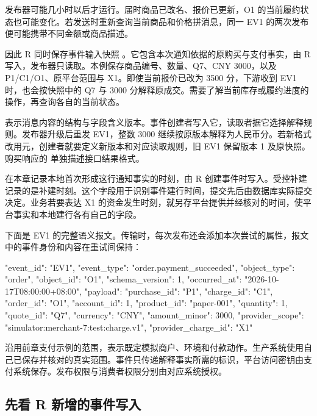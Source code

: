 发布器可能几小时以后才运行。届时商品已改名、报价已更新，O1 的当前履约状态也可能变化。若发送时重新查询当前商品和价格拼消息，同一 EV1 的两次发布便可能携带不同金额或商品描述。

因此 R 同时保存事件输入快照 。它包含本次通知依据的原购买与支付事实，由 R 写入，发布器只读取。本例保存商品编号、数量、Q7、CNY 3000，以及 P1/C1/O1、原平台范围与 X1。即使当前报价已改为 3500 分，下游收到 EV1 时，也会按快照中的 Q7 与 3000 分解释原成交。需要了解当前库存或履约进度的操作，再查询各自的当前状态。


 表示消息内容的结构与字段含义版本。事件创建者写入它，读取者据它选择解释规则。发布器升级后重发 EV1，整数 3000 继续按原版本解释为人民币分。若新格式改用元，创建者就要定义新版本和对应读取规则，旧 EV1 保留版本 1 及原快照。购买响应的  单独描述接口结果格式。

 在本章记录本地首次形成这行通知事实的时刻，由 R 创建事件时写入。受控补建记录的是补建时刻。这个字段用于识别事件建行时间，提交先后由数据库实际提交决定。业务若要表达 X1 的资金发生时刻，就另存平台提供并经核对的时间，使平台事实和本地建行各有自己的字段。

下面是 EV1 的完整语义报文。传输时，每次发布还会添加本次尝试的属性，报文中的事件身份和内容在重试间保持：

\begin{BookCode}
{
  "event_id": "EV1",
  "event_type": "order.payment_succeeded",
  "object_type": "order",
  "object_id": "O1",
  "schema_version": 1,
  "occurred_at": "2026-10-17T08:00:00+08:00",
  "payload": {
    "purchase_id": "P1",
    "charge_id": "C1",
    "order_id": "O1",
    "account_id": 1,
    "product_id": "paper-001",
    "quantity": 1,
    "quote_id": "Q7",
    "currency": "CNY",
    "amount_minor": 3000,
    "provider_scope": "simulator:merchant-7:test:charge.v1",
    "provider_charge_id": "X1"
  }
}
\end{BookCode}

 沿用前章支付示例的范围，表示既定模拟商户、环境和付款动作。生产系统使用自己已保存并核对的真实范围。事件只传递解释事实所需的标识，平台访问密钥由支付系统保存。发布权限与消费者权限分别由对应系统授权。

\subsection*{先看 R 新增的事件写入}


